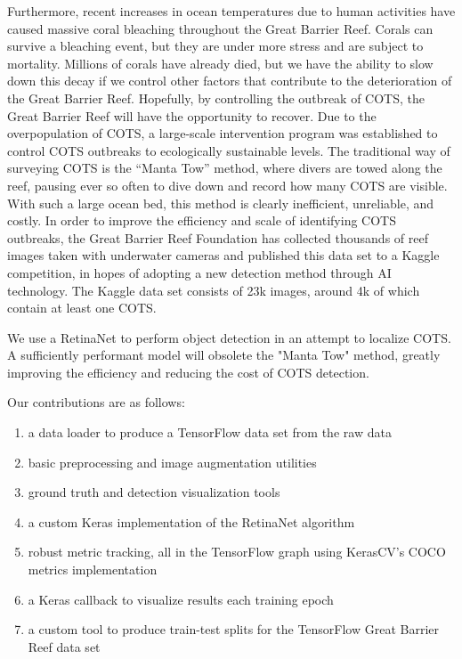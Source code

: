 \documentclass{article}
\begin{document}
Furthermore, recent increases in ocean temperatures due to human activities have caused massive coral bleaching throughout the Great Barrier Reef. Corals can survive a bleaching event, but they are under more stress and are subject to mortality. Millions of corals have already died, but we have the ability to slow down this decay if we control other factors that contribute to the deterioration of the Great Barrier Reef. Hopefully, by controlling the outbreak of COTS, the Great Barrier Reef will have the opportunity to recover. Due to the overpopulation of COTS, a large-scale intervention program was established to control COTS outbreaks to ecologically sustainable levels. The traditional way of surveying COTS is the “Manta Tow” method, where divers are towed along the reef, pausing ever so often to dive down and record how many COTS are visible. With such a large ocean bed, this method is clearly inefficient, unreliable, and costly. In order to improve the efficiency and scale of identifying COTS outbreaks, the Great Barrier Reef Foundation has collected thousands of reef images taken with underwater cameras and published this data set \cite{cots_dataset} to a Kaggle competition, in hopes of adopting a new detection method through AI technology. The Kaggle data set consists of 23k images, around 4k of which contain at least one COTS.

We use a RetinaNet to perform object detection in an attempt to localize COTS. A sufficiently performant model will obsolete the "Manta Tow" method, greatly improving the efficiency and reducing the cost of COTS detection.

Our contributions are as follows:
\begin{enumerate}
    \item a data loader to produce a TensorFlow data set from the raw data
    \item basic preprocessing and image augmentation utilities
    \item ground truth and detection visualization tools
    \item a custom Keras implementation of the RetinaNet algorithm
    \item robust metric tracking, all in the TensorFlow graph using KerasCV's COCO metrics implementation \cite{wood2022kerascv}
    \item a Keras callback to visualize results each training epoch
    \item a custom tool to produce train-test splits for the TensorFlow Great Barrier Reef data set
\end{enumerate}
\end{document}
